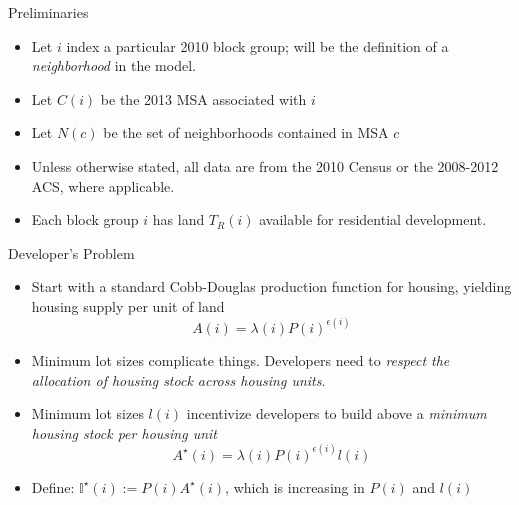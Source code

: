 \documentclass{beamer}
\begin{document}
\begin{frame}{Preliminaries}
	\begin{itemize}
		\color{black}
		\itemsep1em
		\item Let $i$ index a particular 2010 block group; will be the definition of a \textit{neighborhood} in the model.  \pause
		
		\item Let $C(i)$ be the 2013 MSA associated with $i$ \pause
		
		\item Let $N(c)$ be the set of neighborhoods contained in MSA $c$ \pause
		
		\item Unless otherwise stated, all data are from the 2010 Census or the 2008-2012 ACS, where applicable. \pause
		
		\item Each block group $i$ has land $T_{R}(i)$ available for residential  development.  
	\end{itemize}
\end{frame}


\begin{frame}{Developer's Problem}
	\begin{itemize}
		\color{black}
		\item Start with a standard Cobb-Douglas production function for housing, yielding housing supply per unit of land
		\begin{equation}
			A(i) = \lambda(i)P(i)^{\epsilon(i)}
		\end{equation} \pause
		
		
		\item Minimum lot sizes complicate things. Developers need to \color{red}\textit{respect the allocation of housing stock across housing units}\color{black}.
		
		\item Minimum lot sizes $l(i)$ incentivize developers to build above a \textit{minimum housing stock per housing unit}   \pause
		\begin{equation}
			A^{\star}(i) = \lambda(i)P(i)^{\epsilon(i)}l(i)
		\end{equation} \pause
		\item Define: $\mathbb{I}^{\star}(i) := P(i)A^{\star}(i)$, which is increasing in $P(i)$ and $l(i)$
	\end{itemize}
\end{frame}
\end{document}
